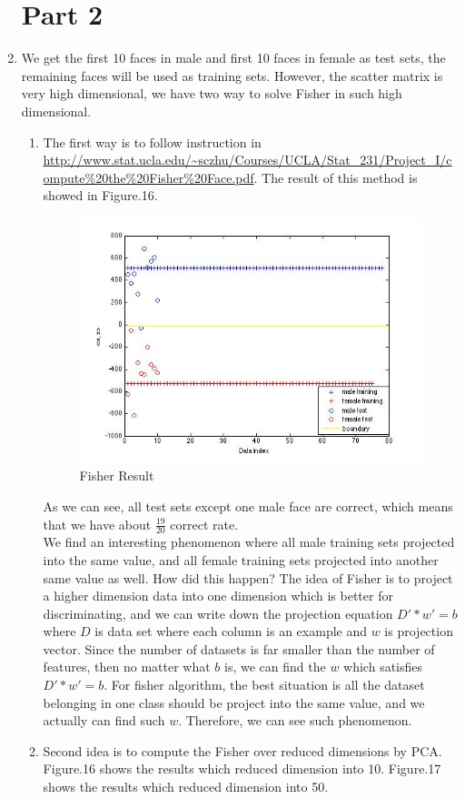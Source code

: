 \documentclass[12pt]{ctexart}
\begin{document}
\begin{enumerate}
\section{Part 2}
\item 
We get the first 10 faces in male and first 10 faces in female as test sets, the remaining faces will be used as training sets. However, the scatter matrix is very high dimensional, we have two way to solve Fisher in such high dimensional. 
\begin{enumerate}
\item
The first way is to follow instruction in \url{http://www.stat.ucla.edu/~sczhu/Courses/UCLA/Stat_231/Project_I/compute\%20the\%20Fisher\%20Face.pdf}. The result of this method is showed in Figure.16.
\begin{figure}[H]
  \centering
  \includegraphics[scale=0.5]{a_fisher_direct.jpg}
  \caption{Fisher Result}
\end{figure}
As we can see, all test sets except one male face are correct, which means that we have about $\frac{19}{20}$ correct rate.\\
We find an interesting phenomenon where all male training sets projected into the same value, and all female training sets projected into another same value as well. How did this happen? The idea of Fisher is to project a higher dimension data into one dimension which is better for discriminating, and we can write down the projection equation $D' * w' = b$ where $D$ is data set where each column is an example and $w$ is projection vector. Since the number of datasets is far smaller than the number of features, then no matter what $b$ is, we can find the $w$ which satisfies $D' * w' = b$. For fisher algorithm, the best situation is all the dataset belonging in one class should be project into the same value, and we actually can find such $w$. Therefore, we can see such phenomenon. 
\item
Second idea is to compute the Fisher over reduced dimensions by PCA. Figure.16 shows the results which reduced dimension into 10. Figure.17 shows the results which reduced dimension into 50.


\end{enumerate}
\end{enumerate}
\end{document}
